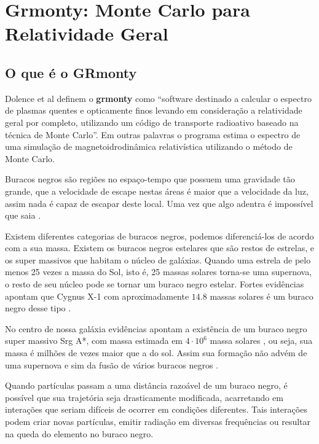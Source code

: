 \chapter{Grmonty: Monte Carlo para Relatividade Geral}
\label{cap:grmonty}

\section{O que é o GRmonty}
  Dolence et al definem o \textbf{grmonty} como ``software destinado a calcular o espectro de plasmas quentes e opticamente finos levando em consideração a relatividade geral por completo, utilizando um código de transporte radioativo baseado na técnica de Monte Carlo''\citep[p.1, traduzido]{Dolence:09}. Em outras palavras o programa estima o espectro de uma simulação de magnetoidrodinâmica \cite{eletro-hidro-dynamic:42} relativística utilizando o método de Monte Carlo.

  Buracos negros são regiões no espaço-tempo que possuem uma gravidade tão grande, que a velocidade de escape nestas áreas é maior que a velocidade da luz, assim nada é capaz de escapar deste local. Uma vez que algo adentra é impossível que saia \cite{fatalgravity:10}.

  Existem diferentes categorias de buracos negros, podemos diferenciá-los de acordo com a sua massa. Existem os buracos negros estelares que são restos de estrelas, e os super massivos que habitam o núcleo de galáxias. Quando uma estrela de pelo menos 25 vezes a massa do Sol, isto é, 25 massas solares torna-se uma supernova, o resto de seu núcleo pode se tornar um buraco negro estelar. Fortes evidências apontam que Cygnus X-1 com aproximadamente $14.8$ massas solares é um buraco negro desse tipo \cite{cygx1:11}.

  No centro de nossa galáxia evidências apontam a existência de um buraco negro super massivo Srg A*, com massa estimada em $4 \cdot 10^6$ massa solares \cite{2016ApJ...830...17B}, ou seja, sua massa é milhões de vezes maior que a do sol. Assim sua formação não advém de uma supernova e sim da fusão de vários buracos negros  \cite{fatalgravity:10}.


  Quando partículas passam a uma distância razoável de um buraco negro, é possível que sua trajetória seja drasticamente modificada, acarretando em interações que seriam difíceis de ocorrer em condições diferentes. Tais interações podem criar novas partículas, emitir radiação em diversas frequências ou resultar na queda do elemento no buraco negro.

